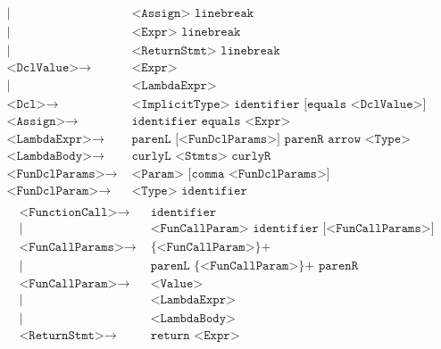 \begin{align*}
	| & \texttt{ <Assign> linebreak}\\
	| & \texttt{ <Expr> linebreak}\\
	| & \texttt{ <ReturnStmt> linebreak}\\
	\texttt{<DclValue>}\to & \texttt{ <Expr>}\\
	| & \texttt{ <LambdaExpr>}\\
	\texttt{<Dcl>}\to & \texttt{ <ImplicitType> identifier [equals <DclValue>]}\\
	\texttt{<Assign>}\to & \texttt{ identifier equals <Expr>}\\
	\texttt{<LambdaExpr>}\to & \texttt{ parenL [<FunDclParams>] parenR arrow <Type> LambdaBody}\\
	\texttt{<LambdaBody>}\to & \texttt{ curlyL <Stmts> curlyR}\\
	\texttt{<FunDclParams>}\to & \texttt{ <Param> [comma <FunDclParams>]}\\
	\texttt{<FunDclParam>}\to & \texttt{ <Type> identifier}\\
	\end{align*}
	\begin{align*}
	\texttt{<FunctionCall>}\to & \texttt{ identifier}\\
	| & \texttt{ <FunCallParam> identifier [<FunCallParams>]}\\
	\texttt{<FunCallParams>}\to & \texttt{ \{<FunCallParam>\}+}\\
	| & \texttt{ parenL \{<FunCallParam>\}+ parenR}\\
	\texttt{<FunCallParam>}\to & \texttt{ <Value>}\\
	| & \texttt{ <LambdaExpr>}\\
	| & \texttt{ <LambdaBody>}\\
	\texttt{<ReturnStmt>}\to & \texttt{ return <Expr>}
\end{align*}